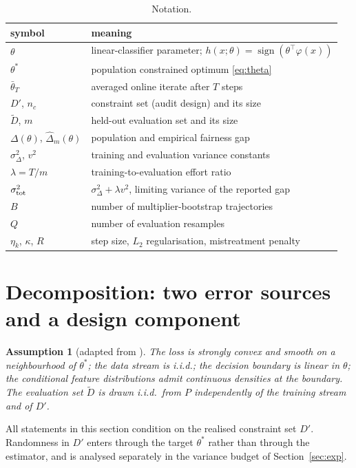 \documentclass[11pt]{article}
\newtheorem{assumption}{Assumption}
\newcommand{\dhat}{\hat\Delta}
\newcommand{\tbar}{\bar\theta}
\newcommand{\Dp}{D'}
\newcommand{\Dt}{\tilde D}
\begin{document}
\begin{table}[t]
\centering
\small
\caption{Notation.}
\label{tab:notation}
\begin{tabular}{ll}
\toprule
symbol & meaning \\
\midrule
$\theta$ & linear-classifier parameter; $h(x;\theta)=\operatorname{sign}(\theta^\top\varphi(x))$ \\
$\theta^*$ & population constrained optimum \eqref{eq:theta} \\
$\tbar_T$ & averaged online iterate after $T$ steps \\
$\Dp$, $n_c$ & constraint set (audit design) and its size \\
$\Dt$, $m$ & held-out evaluation set and its size \\
$\Delta(\theta)$, $\dhat_m(\theta)$ & population and empirical fairness gap \\
$\sigma^2_\Delta$, $v^2$ & training and evaluation variance constants \\
$\lambda=T/m$ & training-to-evaluation effort ratio \\
$\sigma^2_{\rm tot}$ & $\sigma^2_\Delta+\lambda v^2$, limiting variance of the reported gap \\
$B$ & number of multiplier-bootstrap trajectories \\
$Q$ & number of evaluation resamples \\
$\eta_k$, $\kappa$, $R$ & step size, $L_2$ regularisation, mistreatment penalty \\
\bottomrule
\end{tabular}
\end{table}

\section{Decomposition: two error sources and a design component}
\label{sec:decomp}

\begin{assumption}[adapted from \citealp{roy2026uq}]
\label{ass:base}
The loss is strongly convex and smooth on a neighbourhood of $\theta^*$; the data stream is i.i.d.;
the decision boundary is linear in $\theta$; the conditional feature distributions admit continuous
densities at the boundary.  The evaluation set $\Dt$ is drawn i.i.d.\ from $P$ independently of the
training stream and of $\Dp$.
\end{assumption}

All statements in this section condition on the realised constraint set $\Dp$.  Randomness in $\Dp$
enters through the target $\theta^*$ rather than through the estimator, and is analysed separately
in the variance budget of Section~\ref{sec:exp}.
\end{document}
